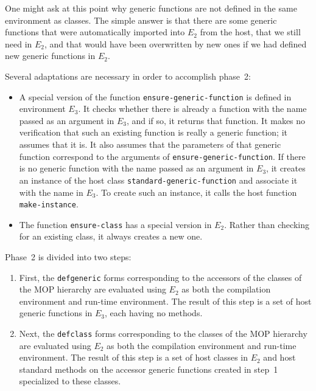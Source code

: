 One might ask at this point why generic functions are not defined in
the same environment as classes.  The simple answer is that there are
some generic functions that were automatically imported into $E_2$
from the host, that we still need in $E_2$, and that would have been
overwritten by new ones if we had defined new generic functions in
$E_2$.

Several adaptations are necessary in order to accomplish phase~2:

\begin{itemize}
\item A special version of the function
  \texttt{ensure-generic-function} is defined in environment $E_3$.
  It checks whether there is already a function with the name passed
  as an argument in $E_3$, and if so, it returns that function.  It
  makes no verification that such an existing function is really a
  generic function; it assumes that it is.  It also assumes that the
  parameters of that generic function correspond to the arguments of
  \texttt{ensure-generic-function}.  If there is no generic function
  with the name passed as an argument in $E_3$, it creates an instance
  of the host class \texttt{standard-generic-function} and associate
  it with the name in $E_3$.  To create such an instance, it calls the
  host function \texttt{make-instance}.
\item The function \texttt{ensure-class} has a special version in
  $E_2$.  Rather than checking for an existing class, it always
  creates a new one.
\end{itemize}

Phase~2 is divided into two steps:

\begin{enumerate}
\item First, the \texttt{defgeneric} forms corresponding to the
  accessors of the classes of the MOP hierarchy are evaluated using
  $E_2$ as both the compilation environment and run-time environment.
  The result of this step is a set of host generic functions in $E_3$,
  each having no methods.
\item Next, the \texttt{defclass} forms corresponding to the classes
  of the MOP hierarchy are evaluated using $E_2$ as both the
  compilation environment and run-time environment.  The result of
  this step is a set of host classes in $E_2$ and host standard
  methods on the accessor generic functions created in step~1
  specialized to these classes.
\end{enumerate}


